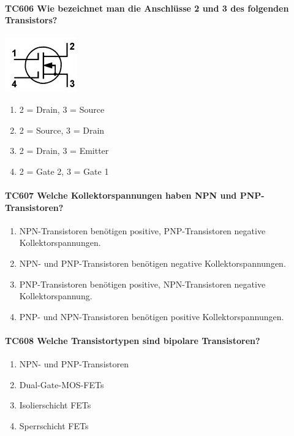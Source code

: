 \documentclass[8pt]{article}
\begin{document}
\begin{enumerate}
\begin{enumerate}[nolistsep,label=\Alph*]
{\begin{enumerate}[nolistsep,label=\Alph*]
\paragraph*{TC606 Wie bezeichnet man die Anschlüsse 2 und 3 des folgenden Transistors?}
\begin{center}
	\begin{minipage}{\linewidth}
		\centering
		\includegraphics[scale=1.0]{pics/tc606_a.jpg}
	\end{minipage}
\end{center}
\begin{enumerate}[nolistsep,label=\Alph*]
\item 2 = Drain, 3 = Source
\item 2 = Source, 3 = Drain
\item 2 = Drain, 3 = Emitter
\item 2 = Gate 2, 3 = Gate 1
\end{enumerate}

\paragraph*{TC607 Welche Kollektorspannungen haben NPN und PNP-Transistoren?}
\begin{enumerate}[nolistsep,label=\Alph*]
\item NPN-Transistoren benötigen positive, PNP-Transistoren negative Kollektorspannungen.
\item NPN- und PNP-Transistoren benötigen negative Kollektorspannungen.
\item PNP-Transistoren benötigen positive, NPN-Transistoren negative Kollektorspannung.
\item PNP- und NPN-Transistoren benötigen positive Kollektorspannungen.
\end{enumerate}

\paragraph*{TC608 Welche Transistortypen sind bipolare Transistoren?}
\begin{enumerate}[nolistsep,label=\Alph*]
\item NPN- und PNP-Transistoren
\item Dual-Gate-MOS-FETs
\item Isolierschicht FETs
\item Sperrschicht FETs
\end{enumerate}


\end{enumerate}}
\end{enumerate}
\end{enumerate}
\end{document}

